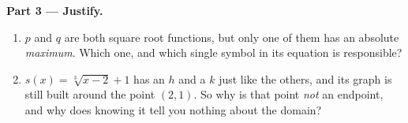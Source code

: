 \documentclass[10pt]{article}
\begin{document}
\begin{tcolorbox}[colback=white, colframe=black!40, title=\textbf{Tier A --- Approaching Proficiency},
    fonttitle=\bfseries, arc=1.5mm, left=3mm, right=3mm, top=2mm, bottom=2mm, breakable]
\vspace{5pt}
\textbf{Part 3 --- Justify.}
\begin{enumerate}[label=\textbf{J\arabic*.}, leftmargin=2.4em, itemsep=6pt]
  \item $p$ and $q$ are both square root functions, but only one of them has an absolute
        \emph{maximum}. Which one, and which single symbol in its equation is responsible?
  \item $s(x)=\sqrt[3]{x-2}+1$ has an $h$ and a $k$ just like the others, and its graph is still
        built around the point $(2,1)$. So why is that point \emph{not} an endpoint, and why does
        knowing it tell you nothing about the domain? 
\end{enumerate}
\end{tcolorbox}
\end{document}
